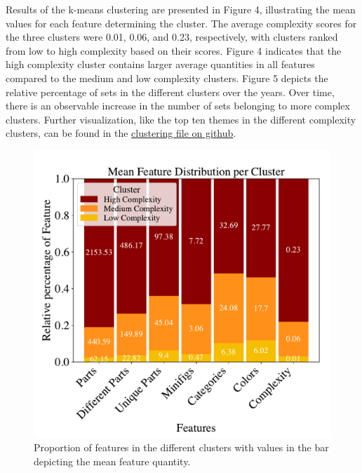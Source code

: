 \documentclass{article}
\theoremstyle{plain}
\theoremstyle{definition}
\theoremstyle{remark}
\begin{document}
Results of the k-means clustering are presented in Figure 4, illustrating the mean values for each feature determining the cluster. The average complexity scores for the three clusters were 0.01, 0.06, and 0.23, respectively, with clusters ranked from low to high complexity based on their scores. Figure 4 indicates that the high complexity cluster contains larger average quantities in all features compared to the medium and low complexity clusters. Figure 5 depicts the relative percentage of sets in the different clusters over the years. Over time, there is an observable increase in the number of sets belonging to more complex clusters. Further visualization, like the top ten themes in the different complexity clusters, can be found in the \href{https://github.com/eddiebeach99/Data_Literacy/blob/main/Analysis/clustering.ipynb}{clustering file on github}.
\begin{figure}[H]
 \begin{center}
 \centerline{\includegraphics[width=\columnwidth]{../Images/Clusters_features.pdf}}
\caption{Proportion of features in the different clusters with values in the bar depicting the mean feature quantity.}
\label{icml-historical}
 \end{center}
 \vskip -0.2in
\end{figure}
\end{document}
